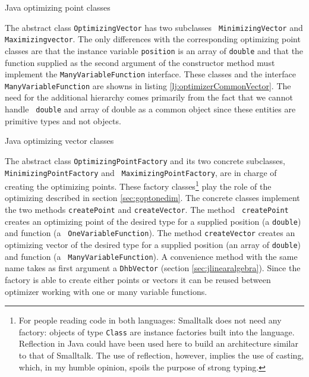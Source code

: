 \documentclass[twoside]{book}
\begin{document}
\begin{listing} Java optimizing point classes \label{lj:optimizerCommonPoint}



\end{listing}

The abstract class {\tt OptimizingVector} has two subclasses {\tt
MinimizingVector} and {\tt Maximizingvector}. The only differences
with the corresponding optimizing point classes are that the
instance variable {\tt position} is an array of {\tt double} and
that the function supplied as the second argument of the
constructor method must implement the {\tt ManyVariableFunction}
interface. These classes and the interface {\tt
ManyVariableFunction} are showns in listing
\ref{lj:optimizerCommonVector}. The need for the additional
hierarchy comes primarily from the fact that we cannot handle {\tt
double} and array of double as a common object since these
entities are primitive types and not objects.

\begin{listing} Java optimizing vector classes \label{lj:optimizerCommonVector}




\end{listing}

The abstract class {\tt OptimizingPointFactory} and its two
concrete subclasses, {\tt MinimizingPointFactory} and {\tt
MaximizingPointFactory}, are in charge of creating the optimizing
points. These factory classes\footnote{For people reading code in
both languages: Smalltalk does not need any factory: objects of
type {\tt Class} are instance factories built into the language.
Reflection in Java could have been used here to build an
architecture similar to that of Smalltalk. The use of reflection,
however, implies the use of casting, which, in my humble opinion,
spoils the purpose of strong typing.} play the role of the
optimizing  described in section
\ref{sec:goptonedim}. The concrete classes implement the two
methods {\tt createPoint} and {\tt createVector}. The method {\tt
createPoint} creates an optimizing point of the desired type for a
supplied position (a {\tt double}) and function (a {\tt
OneVariableFunction}). The method {\tt createVector} creates an
optimizing vector of the desired type for a supplied position (an
array of {\tt double}) and function (a {\tt
ManyVariableFunction}). A convenience method with the same name
takes as first argument a {\tt DhbVector} (\cf section
\ref{sec:jlinearalgebra}). Since the factory is able to create
either points or vectors it can be reused between optimizer
working with one or many variable functions.
\end{document}
